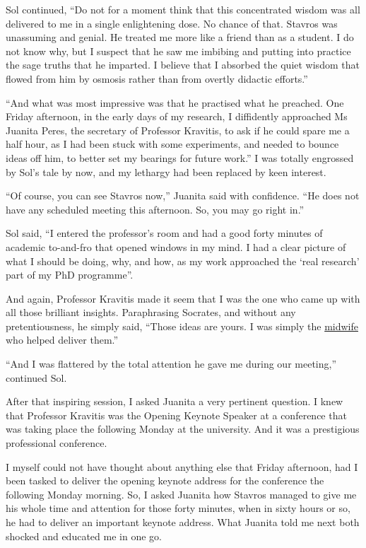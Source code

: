 \documentclass[
  a4paper,
]{article}
\begin{document}
Sol continued, ``Do not for a moment think that this concentrated wisdom
was all delivered to me in a single enlightening dose. No chance of
that. Stavros was unassuming and genial. He treated me more like a
friend than as a student. I do not know why, but I suspect that he saw
me imbibing and putting into practice the sage truths that he imparted.
I believe that I absorbed the quiet wisdom that flowed from him by
osmosis rather than from overtly didactic efforts.''

``And what was most impressive was that he practised what he preached.
One Friday afternoon, in the early days of my research, I diffidently
approached Ms Juanita Peres, the secretary of Professor Kravitis, to ask
if he could spare me a half hour, as I had been stuck with some
experiments, and needed to bounce ideas off him, to better set my
bearings for future work.'' I was totally engrossed by Sol's tale by
now, and my lethargy had been replaced by keen interest.

``Of course, you can see Stavros now,'' Juanita said with confidence.
``He does not have any scheduled meeting this afternoon. So, you may go
right in.''

Sol said, ``I entered the professor's room and had a good forty minutes
of academic to-and-fro that opened windows in my mind. I had a clear
picture of what I should be doing, why, and how, as my work approached
the `real research' part of my PhD programme''.

And again, Professor Kravitis made it seem that I was the one who came
up with all those brilliant insights. Paraphrasing Socrates, and without
any pretentiousness, he simply said, ``Those ideas are yours. I was
simply the
\href{https://philosophycourse.info/lecsite/lec-socmidwife.html}{midwife}
who helped deliver them.''

``And I was flattered by the total attention he gave me during our
meeting,'' continued Sol.

After that inspiring session, I asked Juanita a very pertinent question.
I knew that Professor Kravitis was the Opening Keynote Speaker at a
conference that was taking place the following Monday at the university.
And it was a prestigious professional conference.

I myself could not have thought about anything else that Friday
afternoon, had I been tasked to deliver the opening keynote address for
the conference the following Monday morning. So, I asked Juanita how
Stavros managed to give me his whole time and attention for those forty
minutes, when in sixty hours or so, he had to deliver an important
keynote address. What Juanita told me next both shocked and educated me
in one go.
\end{document}
